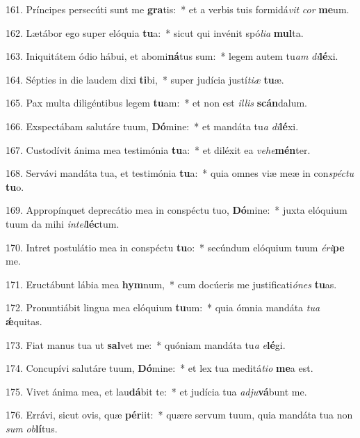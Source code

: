 161. Príncipes persecúti sunt me \textbf{gra}tis:~*  et a verbis tuis formidá\textit{vit} \textit{cor} \textbf{me}um.\

162. Lætábor ego super elóquia \textbf{tu}a:~*  sicut qui invénit spó\textit{li}\textit{a} \textbf{mul}ta.\

163. Iniquitátem ódio hábui, et abomi\textbf{ná}tus sum:~*  legem autem tu\textit{am} \textit{di}\textbf{lé}xi.\

164. Sépties in die laudem dixi \textbf{ti}bi,~*  super judícia justí\textit{ti}\textit{æ} \textbf{tu}æ.\

165. Pax multa diligéntibus legem \textbf{tu}am:~*  et non est \textit{il}\textit{lis} \textbf{scán}dalum.\

166. Exspectábam salutáre tuum, \textbf{Dó}mine:~*  et mandáta tu\textit{a} \textit{di}\textbf{lé}xi.\

167. Custodívit ánima mea testimónia \textbf{tu}a:~*  et diléxit ea \textit{ve}\textit{he}\textbf{mén}ter.\

168. Servávi mandáta tua, et testimónia \textbf{tu}a:~*  quia omnes viæ meæ in con\textit{spéc}\textit{tu} \textbf{tu}o.\

169. Appropínquet deprecátio mea in conspéctu tuo, \textbf{Dó}mine:~*  juxta elóquium tuum da mihi \textit{in}\textit{tel}\textbf{léc}tum.\

170. Intret postulátio mea in conspéctu \textbf{tu}o:~*  secúndum elóquium tuum \textit{é}\textit{ri}\textbf{pe} me.\

171. Eructábunt lábia mea \textbf{hym}num,~*  cum docúeris me justificati\textit{ó}\textit{nes} \textbf{tu}as.\

172. Pronuntiábit lingua mea elóquium \textbf{tu}um:~*  quia ómnia mandáta \textit{tu}\textit{a} \textbf{ǽ}quitas.\

173. Fiat manus tua ut \textbf{sal}vet me:~*  quóniam mandáta tu\textit{a} \textit{e}\textbf{lé}gi.\

174. Concupívi salutáre tuum, \textbf{Dó}mine:~*  et lex tua meditá\textit{ti}\textit{o} \textbf{me}a est.\

175. Vivet ánima mea, et lau\textbf{dá}bit te:~*  et judícia tua \textit{ad}\textit{ju}\textbf{vá}bunt me.\

176. Errávi, sicut ovis, quæ \textbf{pér}iit:~*  quære servum tuum, quia mandáta tua non \textit{sum} \textit{ob}\textbf{lí}tus.\

